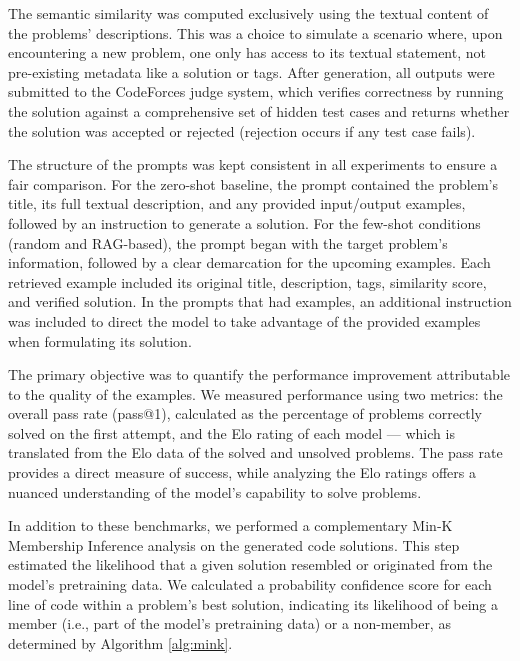 \documentclass[preprint,12pt]{elsarticle}
\begin{document}
The semantic similarity was computed exclusively using the textual content of the problems' descriptions. This was a choice to simulate a scenario where, upon encountering a new problem, one only has access to its textual statement, not pre-existing metadata like a solution or tags. After generation, all outputs were submitted to the CodeForces judge system, which verifies correctness by running the solution against a comprehensive set of hidden test cases and returns whether the solution was accepted or rejected (rejection occurs if any test case fails).

The structure of the prompts was kept consistent in all experiments to ensure a fair comparison. For the zero-shot baseline, the prompt contained the problem's title, its full textual description, and any provided input/output examples, followed by an instruction to generate a solution. For the few-shot conditions (random and RAG-based), the prompt began with the target problem's information, followed by a clear demarcation for the upcoming examples. Each retrieved example included its original title, description, tags, similarity score, and verified solution. In the prompts that had examples, an additional instruction was included to direct the model to take advantage of the provided examples when formulating its solution.

The primary objective was to quantify the performance improvement attributable to the quality of the examples. We measured performance using two metrics: the overall pass rate (pass@1), calculated as the percentage of problems correctly solved on the first attempt, and the Elo rating of each model --- which is translated from the Elo data of the solved and unsolved problems. The pass rate provides a direct measure of success, while analyzing the Elo ratings offers a nuanced understanding of the model's capability to solve problems.

In addition to these benchmarks, we performed a complementary Min‑K Membership Inference analysis on the generated code solutions. This step estimated the likelihood that a given solution resembled or originated from the model’s pretraining data. We calculated a probability confidence score for each line of code within a problem’s best solution, indicating its likelihood of being a member (i.e., part of the model’s pretraining data) or a non-member, as determined by Algorithm \ref{alg:mink}. 

\end{document}
